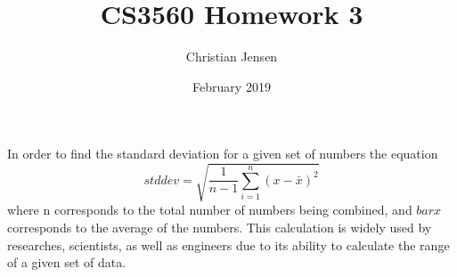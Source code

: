 \documentclass{article}
\title{CS3560 Homework 3}
\author{Christian Jensen}
\date{February 2019}
\begin{document}
\maketitle

In order to find the standard deviation for a given set of numbers the 
equation \[stddev = \sqrt{\frac{1}{n-1}\sum_{i = 1}^n (x - \bar x)^2 }\]
where n corresponds to the total number of numbers being combined, and 
\(bar x\) corresponds to the average of the numbers. This calculation 
is widely used by researches, scientists, as well as engineers due to 
its ability to calculate the range of a given set of data.
\end{document}
